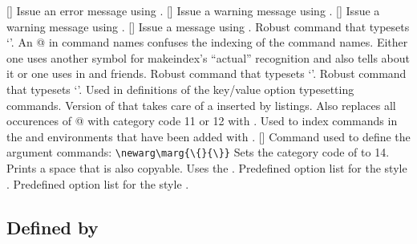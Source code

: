 \documentclass[load-preamble]{cnltx-doc}
\makeatletter
\def\cnltxdoc{\cnltx@package@name@format{cnltx-doc}}
\makeatother
\begin{document}
\begin{commands}
  []
    Issue an error message using .
  []
    Issue a warning message using .
    []
    Issue a warning message using .
  []
    Issue a message using .
    Robust command that typesets `\at'.  An @ in command names confuses the
    indexing of the command names.  Either one uses another symbol for
    makeindex's ``actual'' recognition and also tells  about it
    or one uses  in  and friends.
    Robust command that typesets `\bang'.
    Robust command that typesets `\equal'.
    Used in definitions of the key/value option typesetting commands.
    Version of  that takes care of a  inserted
    by listings. Also replaces all occurences of @ with category code 11 or 12
    with . Used to index commands in the  and
     environments that have been added with .
  []
    Command used to define the argument commands:
    \lstinline[style=cnltx]+\newarg\marg{\{}{\}}+
    Sets the category code of \code{\%} to 14.
    Prints a space that is also copyable.  Uses the .
    Predefined option list for the  style .
    Predefined option list for the  style .
\end{commands}

\subsection{Defined by \cnltxdoc}
\end{document}

